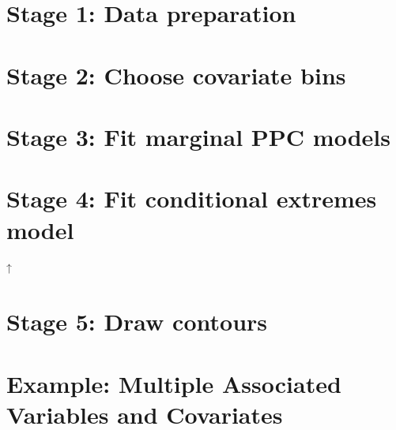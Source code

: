 \documentclass[a4paper,10pt]{article}
\begin{document}
\section{Stage 1: Data preparation}  \label{Sec:Stg1}

\section{Stage 2: Choose covariate bins} \label{Sec:Stg2}

\section{Stage 3: Fit marginal PPC models} \label{Sec:Stg3}

\section{Stage 4: Fit conditional extremes model} \label{Sec:Stg4}

↑\section{Stage 5: Draw contours} \label{Sec:Stg5}



\section{Example: Multiple Associated Variables and Covariates} \label{Sec:Exm}



%
%
%
\appendix





\end{document}
